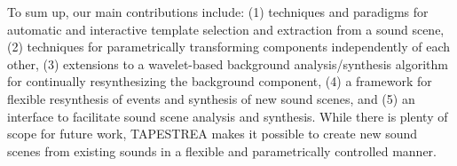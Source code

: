 \documentclass{acmsiggraph}               %
\begin{document}
To sum up, our main contributions include: (1) techniques and paradigms for automatic 
and interactive template selection and extraction from a sound scene, (2) techniques for 
parametrically transforming components independently of each other, (3) extensions to a 
wavelet-based background analysis/synthesis algorithm for continually resynthesizing the 
background component, (4) a framework for flexible resynthesis of events and synthesis 
of new sound scenes, and (5) an interface to facilitate sound scene analysis and synthesis. 
While there is plenty of scope for future work, TAPESTREA makes it possible to create 
new sound scenes from existing sounds in a flexible and parametrically controlled manner. 



\nocite{*}

\end{document}
